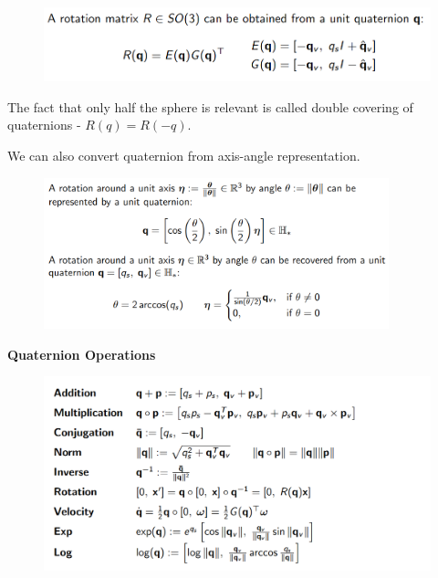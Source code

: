 \begin{figure}[h]\centering\includegraphics[width=12cm]{img/j_3_20.png}\end{figure}

The fact that only half the sphere is relevant is called double covering of quaternions - $R(q) = R(-q)$.

We can also convert quaternion from axis-angle representation.

\begin{figure}[h]\centering\includegraphics[width=10cm]{img/j_3_21.png}\end{figure}

\clearpage

\textbf{Quaternion Operations}

\begin{figure}[h]\centering\includegraphics[width=12cm]{img/j_3_22.png}\end{figure}


